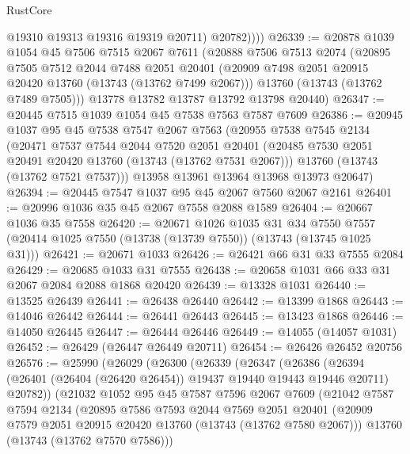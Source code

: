 \begin{lexlean}{RustCore}
\begin{coremodule}
              @19310
              @19313
              @19316
              @19319
              @20711)
            @20782))))
@26339 := @20878
    @1039
    @1054
    @45
    @7506
    @7515
    @2067
    @7611
    (@20888
      @7506
      @7513
      @2074
      (@20895
        @7505
        @7512
        @2044
        @7488
        @2051
        @20401
        (@20909 @7498 @2051 @20915 @20420 @13760 (@13743 (@13762 @7499 @2067)))
        @13760
        (@13743 (@13762 @7489 @7505)))
      @13778
      @13782
      @13787
      @13792
      @13798
      @20440)
@26347 := @20445 @7515 @1039 @1054 @45 @7538 @7563 @7587 @7609
@26386 := @20945
    @1037
    @95
    @45
    @7538
    @7547
    @2067
    @7563
    (@20955
      @7538
      @7545
      @2134
      (@20471
        @7537
        @7544
        @2044
        @7520
        @2051
        @20401
        (@20485 @7530 @2051 @20491 @20420 @13760 (@13743 (@13762 @7531 @2067)))
        @13760
        (@13743 (@13762 @7521 @7537)))
      @13958
      @13961
      @13964
      @13968
      @13973
      @20647)
@26394 := @20445 @7547 @1037 @95 @45 @2067 @7560 @2067 @2161
@26401 := @20996 @1036 @35 @45 @2067 @7558 @2088 @1589
@26404 := @20667 @1036 @35 @7558
@26420 := @20671
    @1026
    @1035
    @31
    @34
    @7550
    @7557
    (@20414 @1025 @7550 (@13738 (@13739 @7550)) (@13743 (@13745 @1025 @31)))
@26421 := @20671 @1033
@26426 := @26421 @66 @31 @33 @7555 @2084
@26429 := @20685 @1033 @31 @7555
@26438 := @20658 @1031 @66 @33 @31 @2067 @2084 @2088 @1868 @20420
@26439 := @13328 @1031
@26440 := @13525 @26439
@26441 := @26438 @26440
@26442 := @13399 @1868
@26443 := @14046 @26442
@26444 := @26441 @26443
@26445 := @13423 @1868
@26446 := @14050 @26445
@26447 := @26444 @26446
@26449 := @14055 (@14057 @1031)
@26452 := @26429 (@26447 @26449 @20711)
@26454 := @26426 @26452 @20756
@26576 := @25990
    (@26029
      (@26300
        (@26339
          (@26347
            (@26386
              (@26394 (@26401 (@26404 (@26420 @26454)) @19437 @19440 @19443 @19446 @20711) @20782))
            (@21032
              @1052
              @95
              @45
              @7587
              @7596
              @2067
              @7609
              (@21042
                @7587
                @7594
                @2134
                (@20895
                  @7586
                  @7593
                  @2044
                  @7569
                  @2051
                  @20401
                  (@20909 @7579 @2051 @20915 @20420 @13760 (@13743 (@13762 @7580 @2067)))
                  @13760
                  (@13743 (@13762 @7570 @7586)))

\end{coremodule}
\end{lexlean}
